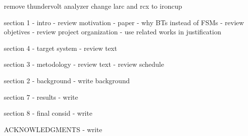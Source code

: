 remove thundervolt analyzer
change larc and rcx to ironcup

section 1 - intro
- review motivation - paper
- why BTs instead of FSMs
- review objetives
- review project organization
- use related works in justification

section 4 - target system
- review text

section 3 - metodology
- review text
- review schedule

section 2 - background
- write background

section 7 - results
- write

section 8 - final consid
- write

ACKNOWLEDGMENTS
- write
